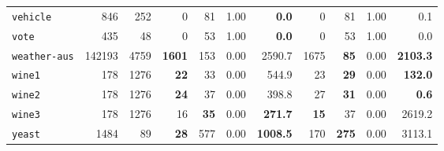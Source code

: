 \begin{tabular}{lccrrrrrrrr}
\texttt{vehicle} & \multicolumn{1}{r}{846} & \multicolumn{1}{r}{252}  & 0 & 81 & 1.00 & \textbf{0.0} & 0 & 81 & 1.00 & 0.1\\
\texttt{vote} & \multicolumn{1}{r}{435} & \multicolumn{1}{r}{48}  & 0 & 53 & 1.00 & \textbf{0.0} & 0 & 53 & 1.00 & 0.0\\
\texttt{weather-aus} & \multicolumn{1}{r}{142193} & \multicolumn{1}{r}{4759}  & \textbf{1601} & 153 & 0.00 & 2590.7 & 1675 & \textbf{85} & 0.00 & \textbf{2103.3}\\
\texttt{wine1} & \multicolumn{1}{r}{178} & \multicolumn{1}{r}{1276}  & \textbf{22} & 33 & 0.00 & 544.9 & 23 & \textbf{29} & 0.00 & \textbf{132.0}\\
\texttt{wine2} & \multicolumn{1}{r}{178} & \multicolumn{1}{r}{1276}  & \textbf{24} & 37 & 0.00 & 398.8 & 27 & \textbf{31} & 0.00 & \textbf{0.6}\\
\texttt{wine3} & \multicolumn{1}{r}{178} & \multicolumn{1}{r}{1276}  & 16 & \textbf{35} & 0.00 & \textbf{271.7} & \textbf{15} & 37 & 0.00 & 2619.2\\
\texttt{yeast} & \multicolumn{1}{r}{1484} & \multicolumn{1}{r}{89}  & \textbf{28} & 577 & 0.00 & \textbf{1008.5} & 170 & \textbf{275} & 0.00 & 3113.1\\
\bottomrule
\end{tabular}
